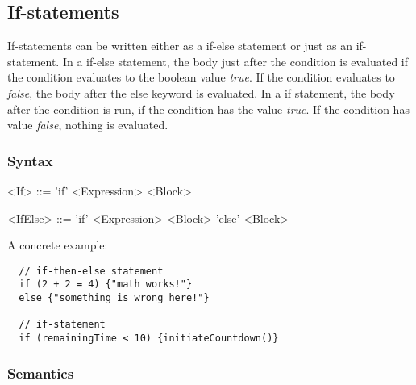 \subsection{If-statements}
\label{subsec:ifStatements}

If-statements can be written either as a if-else statement or just as an if-statement. In a if-else statement, the body just after the condition is evaluated if the condition evaluates to the boolean value \emph{true}. If the condition evaluates to \emph{false}, the body after the else keyword is evaluated. In a if statement, the body after the condition is run, if the condition has the value \emph{true}. If the condition has value \emph{false}, nothing is evaluated.

\subsubsection{Syntax}

\begin{grammar}
<If> ::= 'if' <Expression> <Block>

<IfElse> ::= 'if' <Expression> <Block> 'else' <Block>
\end{grammar}

A concrete example:

\begin{verbatim}
  // if-then-else statement
  if (2 + 2 = 4) {"math works!"}
  else {"something is wrong here!"}

  // if-statement
  if (remainingTime < 10) {initiateCountdown()}
\end{verbatim}

\subsubsection{Semantics}

